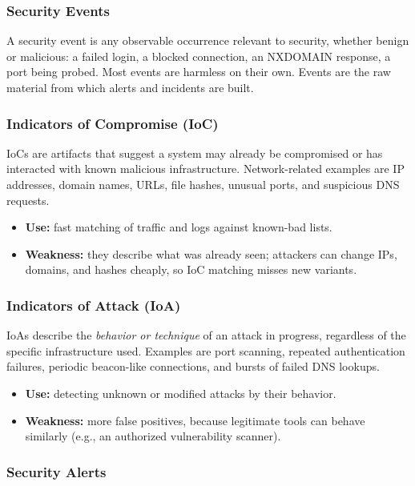 \subsubsection{Security Events}

A security event is any observable occurrence relevant to security, whether benign or malicious: a failed login, a blocked connection, an NXDOMAIN response, a port being probed. Most events are harmless on their own. Events are the raw material from which alerts and incidents are built.

\subsubsection{Indicators of Compromise (IoC)}

IoCs are artifacts that suggest a system may already be compromised or has interacted with known malicious infrastructure. Network-related examples are IP addresses, domain names, URLs, file hashes, unusual ports, and suspicious DNS requests.
\begin{itemize}
  \item \textbf{Use:} fast matching of traffic and logs against known-bad lists.
  \item \textbf{Weakness:} they describe what was already seen; attackers can change IPs, domains, and hashes cheaply, so IoC matching misses new variants.
\end{itemize}

\subsubsection{Indicators of Attack (IoA)}

IoAs describe the \emph{behavior or technique} of an attack in progress, regardless of the specific infrastructure used. Examples are port scanning, repeated authentication failures, periodic beacon-like connections, and bursts of failed DNS lookups.
\begin{itemize}
  \item \textbf{Use:} detecting unknown or modified attacks by their behavior.
  \item \textbf{Weakness:} more false positives, because legitimate tools can behave similarly (e.g., an authorized vulnerability scanner).
\end{itemize}

\subsubsection{Security Alerts}

